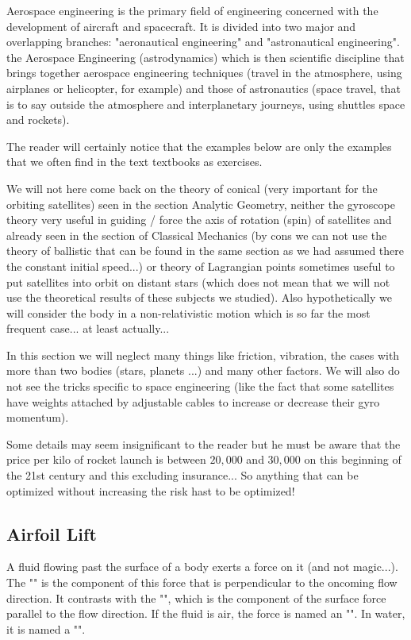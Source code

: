 	Aerospace engineering is the primary field of engineering concerned with the development of aircraft and spacecraft. It is divided into two major and overlapping branches: "aeronautical engineering" and "astronautical engineering". the Aerospace Engineering (astrodynamics) which is then scientific discipline that brings together aerospace engineering techniques  (travel in the atmosphere, using airplanes or helicopter, for example) and those of astronautics (space travel, that is to say outside the atmosphere and interplanetary journeys, using shuttles space and rockets).
	
	The reader will certainly notice that the examples below are only the examples that we often find in the text textbooks as exercises.
	
	We will not here come back on the theory of conical (very important for the orbiting satellites) seen in the section Analytic Geometry, neither the gyroscope theory very useful in guiding / force the axis of rotation (spin) of satellites and already seen in the section of Classical Mechanics (by cons we can not use the theory of ballistic that can be found in the same section as we had assumed there the constant initial speed...) or theory of Lagrangian points sometimes useful to put satellites into orbit on distant stars (which does not mean that we will not use the theoretical results of these subjects we studied). Also hypothetically we will consider the body in a non-relativistic motion which is so far the most frequent case... at least actually...
	
	In this section we will neglect many things like friction, vibration, the cases with more than two bodies (stars, planets ...) and many other factors. We will also do not see the tricks specific to space engineering (like the fact that some satellites have weights attached by adjustable cables to increase or decrease their gyro momentum).
	\begin{tcolorbox}[title=Remark,colframe=black,arc=10pt]
	Some details may seem insignificant to the reader but he must be aware that the price per kilo of rocket launch is between $20,000$ and $30,000$ on this beginning of the 21st century and this excluding insurance... So anything that can be optimized without increasing the risk hast to be optimized!
	\end{tcolorbox}
	
	\pagebreak
	\subsection{Airfoil Lift}
	A fluid flowing past the surface of a body exerts a force on it (and not magic...). The "" is the component of this force that is perpendicular to the oncoming flow direction. It contrasts with the "", which is the component of the surface force parallel to the flow direction. If the fluid is air, the force is named an "". In water, it is named a "".
	
